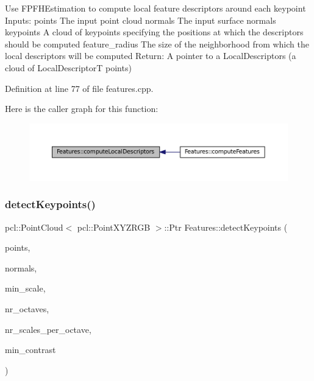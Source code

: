 Use F\+P\+F\+H\+Estimation to compute local feature descriptors around each keypoint Inputs\+: points The input point cloud normals The input surface normals keypoints A cloud of keypoints specifying the positions at which the descriptors should be computed feature\+\_\+radius The size of the neighborhood from which the local descriptors will be computed Return\+: A pointer to a Local\+Descriptors (a cloud of Local\+DescriptorT points) 

Definition at line 77 of file features.\+cpp.

Here is the caller graph for this function\+:
\nopagebreak
\begin{figure}[H]
\begin{center}
\leavevmode
\includegraphics[width=350pt]{class_features_a9a35a8508f21553be97a868a167ac2de_icgraph}
\end{center}
\end{figure}
\hypertarget{class_features_a5c6f5430e675a9216da80875e700f32e}{}\label{class_features_a5c6f5430e675a9216da80875e700f32e} 
\subsubsection{\texorpdfstring{detect\+Keypoints()}{detectKeypoints()}}
{\footnotesize\ttfamily pcl\+::\+Point\+Cloud$<$ pcl\+::\+Point\+X\+Y\+Z\+R\+GB $>$\+::Ptr Features\+::detect\+Keypoints (\begin{DoxyParamCaption}\item[{const pcl\+::\+Point\+Cloud$<$ pcl\+::\+Point\+X\+Y\+Z\+R\+GB $>$\+::Ptr \&}]{points,  }\item[{const pcl\+::\+Point\+Cloud$<$ pcl\+::\+Normal $>$\+::Ptr \&}]{normals,  }\item[{float}]{min\+\_\+scale,  }\item[{int}]{nr\+\_\+octaves,  }\item[{int}]{nr\+\_\+scales\+\_\+per\+\_\+octave,  }\item[{float}]{min\+\_\+contrast }\end{DoxyParamCaption})}


